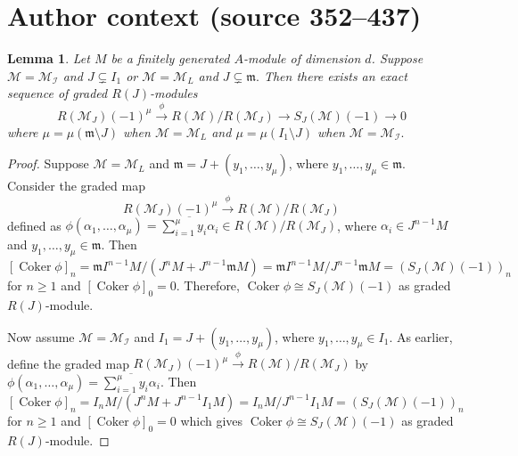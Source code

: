 \documentclass[10pt,a4paper]{amsart}
\newtheorem{lemma}{Lemma}
\def\I{{\mathcal I}}
\def\M{{\mathcal M}}
\newcommand{\m}{\mathfrak m}
\DeclareMathOperator{\coker}{Coker}
\begin{document}
\section*{Author context (source 352--437)}
\begin{lemma}\label{lemma-3.1(a)} Let $M$ be a finitely generated $A$-module of dimension $d$.  Suppose $\M=\M_\I$ and $J\subsetneq I_1$ or $\M=\M_L$ and $J\subsetneq \m.$ 
Then there exists an exact sequence of graded $R(J)$-modules
$$
    R(\M_J)(-1)^\mu\xrightarrow{\phi}R(\mathcal{M})/ R(\M_J)\to S_J(\M)(-1)\to 0
    $$ 
    where  $\mu=\mu(\m \setminus J)$ when $\M=\M_L$ and  $\mu=\mu(I_1\setminus J)$ when $\M=\M_\I.$ 
\end{lemma}
\begin{proof}
 Suppose $\M=\M_L$ and  $\m =J+(y_1,\ldots,y_\mu)$, where $y_1,\ldots,y_\mu \in \m$. Consider the graded map 
	$$R(\M_J)(-1)^\mu\xrightarrow{\phi} R(\mathcal{M})/R(\M_J)$$
	defined as $\phi(\alpha_1,\ldots,\alpha_\mu )=\overline{\mathop\sum\limits_{i=1}^\mu y_i \alpha_i }\in R(\mathcal{M})/R(\M_J)$, where $\alpha_i \in J^{n-1}M $ and $y_1,\ldots,y_{\mu}\in \m $. Then
	$[\coker \phi]_{n}=\m I^{n-1}M/(J^nM+J^{n-1}\m M)=\m I^{n-1}M/J^{n-1}\m M=(S_J(\M)(-1))_{n}$ for $n\geq 1$ and
	$[\coker \phi]_{0}=0$. Therefore,
	$\coker \phi\cong S_J(\M)(-1)$ as graded $R(J)$-module.

    Now assume $\M=\M_\I$ and $I_1=J+(y_1,\ldots,y_\mu)$, where $y_1,\ldots,y_\mu \in I_1$. As earlier, define the graded map $R(\M_J)(-1)^\mu\xrightarrow{\phi} R(\mathcal{M})/R(\M_J)$ by  $\phi(\alpha_1,\ldots,\alpha_\mu )=\overline{\mathop\sum\limits_{i=1}^\mu y_i \alpha_i}$. Then $[\coker \phi]_{n}=I_{n}M/(J^nM+J^{n-1}I_1M)=I_{n}M/J^{n-1}I_1M=(S_J(\M)(-1))_{n}$ for $n\geq 1$ and
	$[\coker \phi]_{0}=0$ which gives 
	$\coker \phi\cong S_J(\M)(-1)$ as graded $R(J)$-module.
\end{proof}
\end{document}
